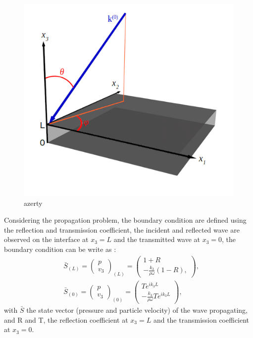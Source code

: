 \documentclass{article}
\begin{document}
    \begin{figure}[ht]
        \centering
        \includegraphics[scale=0.6]{Fig3D.png}
        \caption{azerty}
        \label{Schema_PB}
    \end{figure}
    
    Considering the propagation problem, the boundary condition are defined using the reflection and transmission coefficient, the incident and reflected wave are observed on the interface at $x_3=L$ and the transmitted wave at $x_3=0$, the boundary condition can be write as :
     \begin{align}
    &\bar{S}_{(L)}=\begin{pmatrix}
    	p \\ v_3
    \end{pmatrix}_{(L)}=\begin{pmatrix}
    					    1+R \\ -\frac{k_3}{\rho \omega}(1-R),
    					\end{pmatrix},\label{BC_L} \\
  	&\bar{S}_{(0)}=\begin{pmatrix}
    	p \\ v_3
    \end{pmatrix}_{(0)}=\begin{pmatrix}
    						Te^{ik_3L} \\ -\frac{k_3}{\rho \omega}Te^{ik_3L}
    					\end{pmatrix},\label{BC_0}
    \end{align}                         
    with $\bar{S}$ the state vector (pressure and particle velocity) of the wave propagating, and R and T, the reflection coefficient at $x_3=L$ and the transmission coefficient at $x_3=0$.  
    
\end{document}
